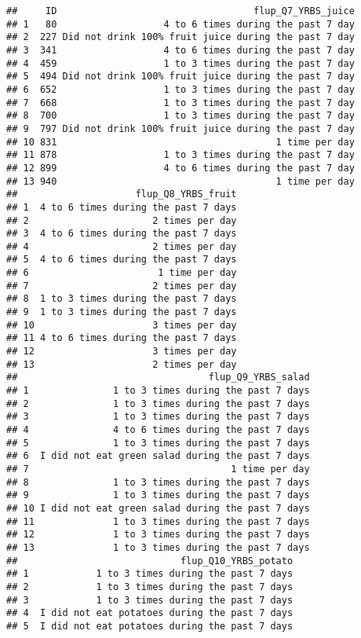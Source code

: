 \documentclass[]{article}
\begin{document}
\begin{verbatim}
##     ID                                   flup_Q7_YRBS_juice
## 1   80                   4 to 6 times during the past 7 day
## 2  227 Did not drink 100% fruit juice during the past 7 day
## 3  341                   4 to 6 times during the past 7 day
## 4  459                   1 to 3 times during the past 7 day
## 5  494 Did not drink 100% fruit juice during the past 7 day
## 6  652                   1 to 3 times during the past 7 day
## 7  668                   1 to 3 times during the past 7 day
## 8  700                   1 to 3 times during the past 7 day
## 9  797 Did not drink 100% fruit juice during the past 7 day
## 10 831                                       1 time per day
## 11 878                   1 to 3 times during the past 7 day
## 12 899                   4 to 6 times during the past 7 day
## 13 940                                       1 time per day
##                     flup_Q8_YRBS_fruit
## 1  4 to 6 times during the past 7 days
## 2                      2 times per day
## 3  4 to 6 times during the past 7 days
## 4                      2 times per day
## 5  4 to 6 times during the past 7 days
## 6                       1 time per day
## 7                      2 times per day
## 8  1 to 3 times during the past 7 days
## 9  1 to 3 times during the past 7 days
## 10                     3 times per day
## 11 4 to 6 times during the past 7 days
## 12                     3 times per day
## 13                     2 times per day
##                                  flup_Q9_YRBS_salad
## 1               1 to 3 times during the past 7 days
## 2               1 to 3 times during the past 7 days
## 3               1 to 3 times during the past 7 days
## 4               4 to 6 times during the past 7 days
## 5               1 to 3 times during the past 7 days
## 6  I did not eat green salad during the past 7 days
## 7                                    1 time per day
## 8               1 to 3 times during the past 7 days
## 9               1 to 3 times during the past 7 days
## 10 I did not eat green salad during the past 7 days
## 11              1 to 3 times during the past 7 days
## 12              1 to 3 times during the past 7 days
## 13              1 to 3 times during the past 7 days
##                             flup_Q10_YRBS_potato
## 1            1 to 3 times during the past 7 days
## 2            1 to 3 times during the past 7 days
## 3            1 to 3 times during the past 7 days
## 4  I did not eat potatoes during the past 7 days
## 5  I did not eat potatoes during the past 7 days

\end{verbatim}
\end{document}
